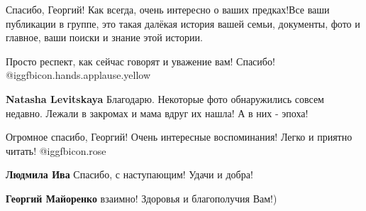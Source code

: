 
 
 
 
 
\zzSecCmt

\begin{itemize} %

Спасибо, Георгий! Как всегда, очень интересно о ваших предках!Все ваши
публикации в группе, это такая далёкая история вашей семьи, документы, фото и
главное, ваши поиски и знание этой истории.

Просто респект, как сейчас говорят и уважение вам! Спасибо! @igg{fbicon.hands.applause.yellow} 

\begin{itemize} %
\textbf{Natasha Levitskaya} Благодарю. Некоторые фото обнаружились совсем недавно. Лежали в закромах и мама вдруг их нашла! А в них - эпоха!
\end{itemize} %


Огромное спасибо, Георгий! Очень интересные воспоминания! Легко и приятно
читать! @igg{fbicon.rose} 

\begin{itemize} %
\textbf{Людмила Ива} Спасибо, с наступающим! Удачи и добра!

\textbf{Георгий Майоренко} взаимно! Здоровья и благополучия Вам!)
\end{itemize} %

\end{itemize} %
